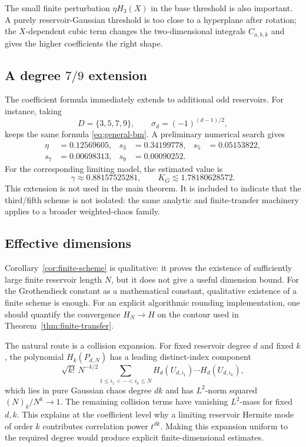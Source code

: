 \documentclass[11pt]{article}
\newcommand{\1}{\mathbf 1}
\newcommand{\KG}{K_G}
\theoremstyle{plain}
\theoremstyle{definition}
\theoremstyle{remark}
\begin{document}
The small finite perturbation \(\eta H_3(X)\) in the base threshold is also important.  A purely reservoir-Gaussian threshold is too close to a hyperplane after rotation; the \(X\)-dependent cubic term changes the two-dimensional integrals \(C_{a,b,k}\) and gives the higher coefficients the right shape.

\subsection{A degree \texorpdfstring{\(7/9\)}{7/9} extension}

The coefficient formula immediately extends to additional odd reservoirs.  For instance, taking
\[
  D=\{3,5,7,9\},
  \qquad
  \sigma_d=(-1)^{(d-1)/2},
\]
keeps the same formula \eqref{eq:general-bm}.  A preliminary numerical search gives
\begin{align*}
  \eta&=0.12569605,&
  s_3&=0.34199778,&
  s_5&=0.05153822,\\
  s_7&=0.00698313,&
  s_9&=0.00090252.
\end{align*}
For the corresponding limiting model, the estimated value is
\[
  \gamma\approx0.88157525281,
  \qquad
  \KG\lesssim1.78180628572.
\]
This extension is not used in the main theorem.  It is included to indicate that the third/fifth scheme is not isolated: the same analytic and finite-transfer machinery applies to a broader weighted-chaos family.

\subsection{Effective dimensions}

Corollary~\ref{cor:finite-scheme} is qualitative: it proves the existence of sufficiently large finite reservoir length \(N\), but it does not give a useful dimension bound.  For the Grothendieck constant as a mathematical constant, qualitative existence of a finite scheme is enough.  For an explicit algorithmic rounding implementation, one should quantify the convergence \(H_N\to H\) on the contour used in Theorem~\ref{thm:finite-transfer}.

The natural route is a collision expansion.  For fixed reservoir degree \(d\) and fixed \(k\), the polynomial \(H_k(P_{d,N})\) has a leading distinct-index component
\[
  \sqrt{k!}\,N^{-k/2}
  \sum_{1\le i_1<\cdots<i_k\le N}
  H_d(U_{d,i_1})\cdots H_d(U_{d,i_k}),
\]
which lies in pure Gaussian chaos degree \(dk\) and has \(L^2\)-norm squared \((N)_k/N^k\to1\).  The remaining collision terms have vanishing \(L^2\)-mass for fixed \(d,k\).  This explains at the coefficient level why a limiting reservoir Hermite mode of order \(k\) contributes correlation power \(t^{dk}\).  Making this expansion uniform to the required degree would produce explicit finite-dimensional estimates.
\end{document}
